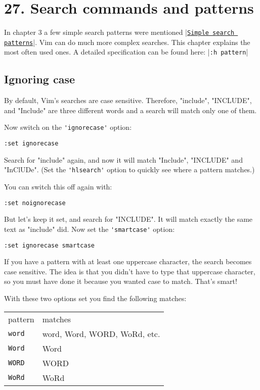 \section{27. Search commands and patterns}
\label{Search commands and patterns}
In chapter 3 a few simple search patterns were mentioned |\hyperref[Simple search patterns]{\texttt{Simple search patterns}}|.
Vim can do much more complex searches.
This chapter explains the most often used ones.
A detailed specification can be found here: |\verb!:h pattern!|
\subsection{Ignoring case}
By default, Vim's searches are case sensitive.
Therefore, "include", "INCLUDE", and "Include" are three different words and a search will match only one of them.

Now switch on the \verb!'ignorecase'! option:

\begin{Verbatim}[samepage=true]
 :set ignorecase
\end{Verbatim}

Search for "include" again, and now it will match "Include", "INCLUDE" and "InClUDe".
(Set the \verb!'hlsearch'! option to quickly see where a pattern matches.)

You can switch this off again with:

\begin{Verbatim}[samepage=true]
 :set noignorecase
\end{Verbatim}

But let's keep it set, and search for "INCLUDE".
It will match exactly the same text as "include" did.
Now set the \verb!'smartcase'! option:

\begin{Verbatim}[samepage=true]
 :set ignorecase smartcase
\end{Verbatim}

If you have a pattern with at least one uppercase character, the search becomes case sensitive.
The idea is that you didn't have to type that uppercase character, so you must have done it because you wanted case to match.
That's smart!

With these two options set you find the following matches:

\begin{center} \begin{tabular}{l l}
				pattern & matches \\
				\verb!word! & word, Word, WORD, WoRd, etc.\\
				\verb!Word! & Word\\
				\verb!WORD! & WORD\\
				\verb!WoRd! & WoRd\\
\end{tabular} \end{center}

